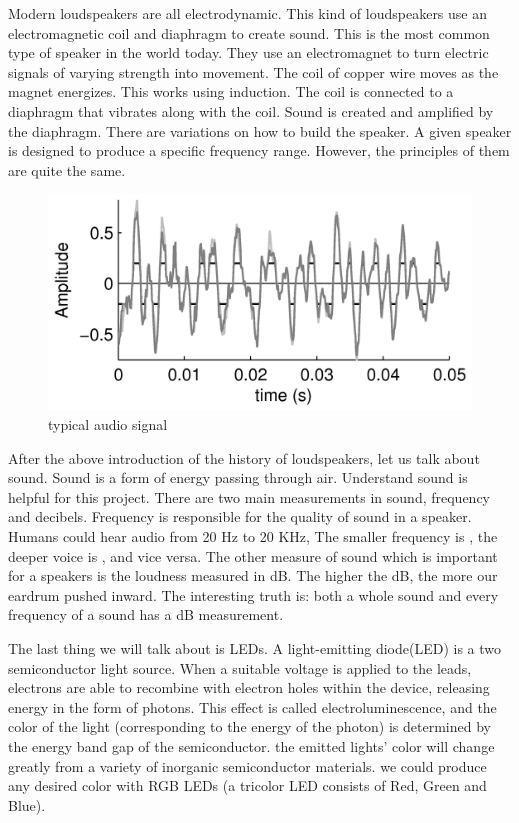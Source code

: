 \documentclass[12pt,a4paper,journal]{IEEEtran}
\begin{document}
Modern loudspeakers are all electrodynamic. This kind of loudspeakers use an electromagnetic coil and diaphragm to create sound. This is the most common type of speaker in the world today. They use an electromagnet to turn electric signals of varying strength into movement. The coil of copper wire moves as the magnet energizes. This works using induction. The coil is connected to a diaphragm that vibrates along with the coil. Sound is created and amplified by the diaphragm. There are variations on how to build the speaker. A given speaker is designed to produce a specific frequency range. However, the principles of them are quite the same.
\begin{figure}[ht]
  \centering
  \includegraphics[width=0.9\linewidth]{audiosignal.png}
  \caption{typical audio signal}
  \label{fig:tas1}
\end{figure}
After the above introduction of the history of loudspeakers, let us talk about sound. Sound is a form of energy passing through air. Understand sound is helpful for this project. There are two main measurements in sound, frequency and decibels. Frequency is responsible for the quality of sound in a speaker. Humans could hear audio from 20 Hz to 20 KHz, The smaller frequency is , the deeper voice is , and vice versa. The other measure of sound which is important for a speakers is the loudness measured in dB. The higher the dB, the more our eardrum pushed inward. The interesting truth is: both a whole sound and every frequency of a sound has a dB measurement.

The last thing we will talk about is LEDs. A light-emitting diode(LED) is a two semiconductor light source. When a suitable voltage is applied to the leads, electrons are able to recombine with electron holes within the device, releasing energy in the form of photons. This effect is called electroluminescence, and the color of the light (corresponding to the energy of the photon) is determined by the energy band gap of the semiconductor. the emitted lights' color will change greatly from a variety of inorganic semiconductor materials. we could produce any desired color with RGB LEDs (a tricolor LED consists of Red, Green and Blue).
\end{document}
